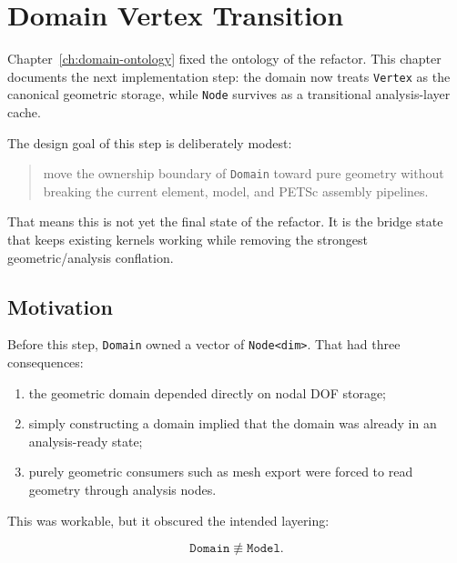 
\chapter{Domain Vertex Transition}
\label{ch:domain-vertex-transition}

Chapter~\ref{ch:domain-ontology} fixed the ontology of the refactor.  This
chapter documents the next implementation step: the domain now treats
\texttt{Vertex} as the canonical geometric storage, while \texttt{Node}
survives as a transitional analysis-layer cache.

The design goal of this step is deliberately modest:

\begin{quote}
move the ownership boundary of \texttt{Domain} toward pure geometry without
breaking the current element, model, and PETSc assembly pipelines.
\end{quote}

That means this is not yet the final state of the refactor.  It is the
bridge state that keeps existing kernels working while removing the strongest
geometric/analysis conflation.


\section{Motivation}
\label{sec:domain-vertex-transition-motivation}

Before this step, \texttt{Domain} owned a vector of \texttt{Node<dim>}.  That
had three consequences:

\begin{enumerate}[nosep]
  \item the geometric domain depended directly on nodal DOF storage;
  \item simply constructing a domain implied that the domain was already in an
        analysis-ready state;
  \item purely geometric consumers such as mesh export were forced to read
        geometry through analysis nodes.
\end{enumerate}

This was workable, but it obscured the intended layering:

\[
\texttt{Domain} \not\equiv \texttt{Model}.
\]

